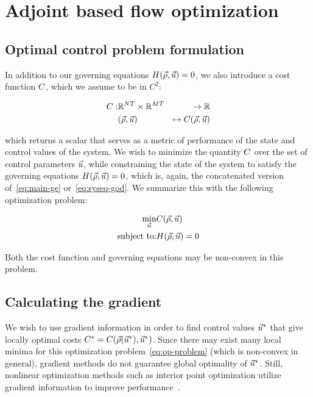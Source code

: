 
\section{Adjoint based flow optimization\label{sec:Adjoint-method}}


\subsection{Optimal control problem formulation\label{par:Optimization-Problem}}

In addition to our governing equations $\sys\left(\state,\control\right)=0$,
we also introduce a cost function $C$, which we assume to be
in $C^{2}$:

\begin{eqnarray*}
\cost: & \mathbb{R}^{\nlinks T}\times\mathbb{R}^{\ncontrols T} & \rightarrow\mathbb{R}\\
 & \left(\state,\control\right) & \mapsto\cost\left(\state,\control\right)
\end{eqnarray*}


which returns a scalar that serves as a metric of performance of the
state and control values of the system. We wish to minimize the quantity
$C$ over the set of control parameters $\vec{u}$, while constraining
the state of the system to satisfy the governing equations $\sys\left(\state,\control\right)=0$,
which is, again, the concatenated version of~\eqref{eq:main-ge} or~\eqref{eq:syseq-god}.
We summarize this with the following optimization problem:

\begin{eqnarray}
\underset{\control}{\min} & \cost\left(\state,\control\right)\nonumber \\
\text{subject to:} & \sys\left(\state,\control\right)=0\label{eq:op-problem}
\end{eqnarray}


Both the cost function and governing equations may be non-convex in
this problem.


\subsection{Calculating the gradient\label{par:Calculating-the-gradient}}

We wish to use gradient information in order to find control values
$\vec{u}^{*}$ that give locally optimal costs $\cost^{*}=\cost\left(\state\left(\control^{*}\right),\control^{*}\right)$.
Since there may exist many local minima for this optimization problem~\eqref{eq:op-problem}
(which is non-convex in general), gradient\emph{ }methods do not guarantee
global optimality of $\vec{u}^{*}$\emph{. }Still, nonlinear optimization
methods such as interior point optimization utilize gradient information
to improve performance~\cite{Andreas2005}.


